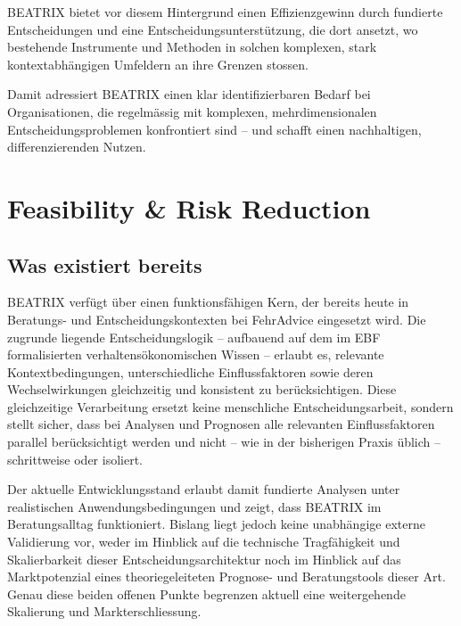 \documentclass[11pt,a4paper]{article}
\begin{document}
BEATRIX bietet vor diesem Hintergrund einen Effizienzgewinn durch fundierte Entscheidungen und eine Entscheidungsunterstützung, die dort ansetzt, wo bestehende Instrumente und Methoden in solchen komplexen, stark kontextabhängigen Umfeldern an ihre Grenzen stossen.

Damit adressiert BEATRIX einen klar identifizierbaren Bedarf bei Organisationen, die regelmässig mit komplexen, mehrdimensionalen Entscheidungsproblemen konfrontiert sind -- und schafft einen nachhaltigen, differenzierenden Nutzen.

\newpage


\section{Feasibility \& Risk Reduction}

\subsection{Was existiert bereits}

BEATRIX verfügt über einen funktionsfähigen Kern, der bereits heute in Beratungs- und Entscheidungskontexten bei FehrAdvice eingesetzt wird. Die zugrunde liegende Entscheidungslogik -- aufbauend auf dem im EBF formalisierten verhaltensökonomischen Wissen -- erlaubt es, relevante Kontextbedingungen, unterschiedliche Einflussfaktoren sowie deren Wechselwirkungen gleichzeitig und konsistent zu berücksichtigen. Diese gleichzeitige Verarbeitung ersetzt keine menschliche Entscheidungsarbeit, sondern stellt sicher, dass bei Analysen und Prognosen alle relevanten Einflussfaktoren parallel berücksichtigt werden und nicht -- wie in der bisherigen Praxis üblich -- schrittweise oder isoliert.

Der aktuelle Entwicklungsstand erlaubt damit fundierte Analysen unter realistischen Anwendungsbedingungen und zeigt, dass BEATRIX im Beratungsalltag funktioniert. Bislang liegt jedoch keine unabhängige externe Validierung vor, weder im Hinblick auf die technische Tragfähigkeit und Skalierbarkeit dieser Entscheidungsarchitektur noch im Hinblick auf das Marktpotenzial eines theoriegeleiteten Prognose- und Beratungstools dieser Art. Genau diese beiden offenen Punkte begrenzen aktuell eine weitergehende Skalierung und Markterschliessung.
\end{document}
